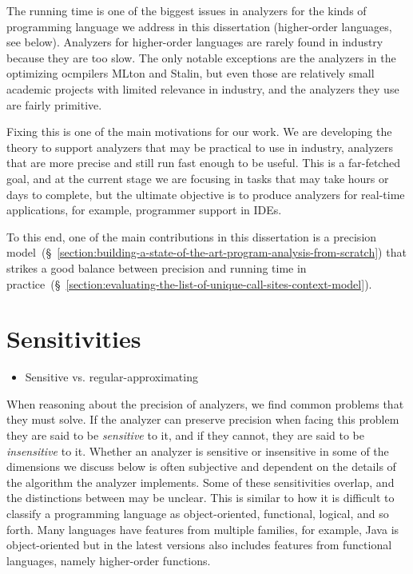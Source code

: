 \documentclass[12pt, oneside]{book}
\begin{document}
The running time is one of the biggest issues in analyzers for the kinds of programming language we address in this dissertation (higher-order languages, see below). Analyzers for higher-order languages are rarely found in industry because they are too slow. The only notable exceptions are the analyzers in the optimizing ocmpilers MLton and Stalin, but even those are relatively small academic projects with limited relevance in industry, and the analyzers they use are fairly primitive.

Fixing this is one of the main motivations for our work. We are developing the theory to support analyzers that may be practical to use in industry, analyzers that are more precise and still run fast enough to be useful. This is a far-fetched goal, and at the current stage we are focusing in tasks that may take hours or days to complete, but the ultimate objective is to produce analyzers for real-time applications, for example, programmer support in IDEs.

To this end, one of the main contributions in this dissertation is a precision model~(§~\ref{section:building-a-state-of-the-art-program-analysis-from-scratch}) that strikes a good balance between precision and running time in practice~(§~\ref{section:evaluating-the-list-of-unique-call-sites-context-model}).

\section{Sensitivities}
\label{section:sensitivities}

\begin{itemize}
  \item Sensitive vs. regular-approximating
\end{itemize}

When reasoning about the precision of analyzers, we find common problems that they must solve. If the analyzer can preserve precision when facing this problem they are said to be \emph{sensitive} to it, and if they cannot, they are said to be \emph{insensitive} to it. Whether an analyzer is sensitive or insensitive in some of the dimensions we discuss below is often subjective and dependent on the details of the algorithm the analyzer implements. Some of these sensitivities overlap, and the distinctions between may be unclear. This is similar to how it is difficult to classify a programming language as object-oriented, functional, logical, and so forth. Many languages have features from multiple families, for example, Java is object-oriented but in the latest versions also includes features from functional languages, namely higher-order functions.
\end{document}
